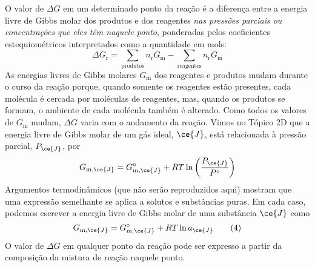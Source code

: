 O valor de \(\Delta G\) em um determinado ponto da reação é a diferença entre a energia livre de Gibbs molar dos produtos e dos reagentes \emph{nas
pressões parciais ou concentrações que eles têm naquele ponto}, ponderadas pelos coeficientes estequiométricos interpretados como a quantidade em
mols: \[
    \Delta G_\mathrm{r} 
        = \sum_\text{produtos} n_\mathrm{r} G_\mathrm{m} 
        - \sum_\text{reagentes} n_\mathrm{r} G_\mathrm{m}
\tag{3}
\] As energias livres de Gibbs molares \(G_\mathrm{m}\) dos reagentes e produtos mudam durante o curso da reação porque, quando somente os reagentes
estão presentes, cada molécula é cercada por moléculas de reagentes, mas, quando os produtos se formam, o ambiente de cada molécula também é alterado.
Como todos os valores de \(G_\mathrm{m}\) mudam, \(\Delta G\) varia com o andamento da reação. Vimos no Tópico 2D que a energia livre de Gibbs molar
de um gás ideal, \(\ce{J}\), está relacionada à pressão parcial, \(P_{\ce{J}}\), por \[
    G_{\mathrm{m}, \ce{J}} 
        = G_{\mathrm{m}, \ce{J}}^\circ + RT \ln \left( \dfrac{ P_{\ce{J}} }{ P^\circ } \right)
\] Argumentos termodinâmicos (que não serão reproduzidos aqui) mostram que uma expressão semelhante se aplica a solutos e substâncias puras. Em cada
caso, podemos escrever a energia livre de Gibbs molar de uma substância \(\ce{J}\) como \[
    G_{\mathrm{m}, \ce{J}} = G_{\mathrm{m}, \ce{J}}^\circ + RT \ln a_{\ce{J}}
\tag{4}
\] O valor de \(\Delta G\) em qualquer ponto da reação pode ser expresso a partir da composição da mistura de reação naquele ponto.

